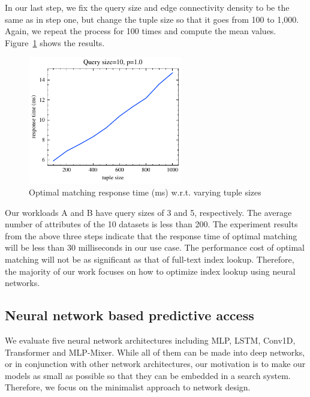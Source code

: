 \documentclass[conference]{IEEEtran}
\begin{document}
In our last step, we fix the query size and edge connectivity density to be the same as in step one, but change the tuple size so that it goes from 100 to 1,000. Again, we repeat the process for 100 times and compute the mean values. Figure~\ref{fig:tuple_completion_3} shows the results.
\begin{figure}[!th]
	\centering
	\includegraphics[width=0.6\textwidth]{graphics/tuple_completion_3.pdf}
	\caption{Optimal matching response time (ms) w.r.t. varying tuple sizes}
	\label{fig:tuple_completion_3}
\end{figure}

Our workloads A and B have query sizes of 3 and 5, respectively. The average number of attributes of the 10 datasets is less than 200. 
The experiment results from the above three steps indicate that the response time of optimal matching will be less than 30 milliseconds in our use case. 
The performance cost of optimal matching will not be as significant as that of full-text index lookup. 
Therefore, the majority of our work focuses on how to optimize index lookup using neural networks.

\subsection{Neural network based predictive access}
\label{subsection:nn_experiments}

We evaluate five neural network architectures including MLP, LSTM, Conv1D, Transformer and MLP-Mixer. While all of them can be made into deep networks, or in conjunction with other network architectures, our motivation is to make our models as small as possible so that they can be embedded in a search system.
Therefore, we focus on the minimalist approach to network design.
\end{document}
